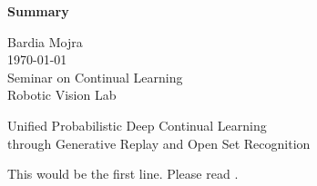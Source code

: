 \documentclass[12pt]{article}
\begin{document}
\begin{center}
\textbf{Summary}\\
\end{center}

\noindent
Bardia Mojra\\
\today\\
Seminar on Continual Learning\\
Robotic Vision Lab\\
\begin{center}
Unified Probabilistic Deep Continual Learning\\
through Generative Replay and Open Set Recognition\\
\end{center}

This would be the first line. Please read \cite{mur2015orb}.\\




\end{document}
